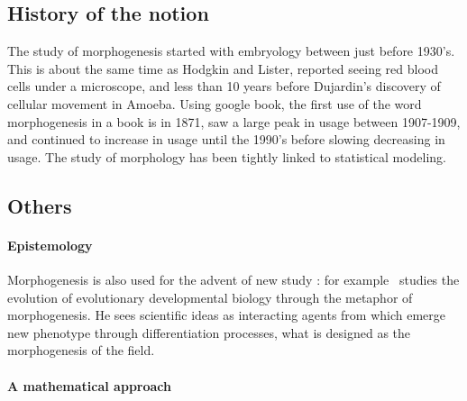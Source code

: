 \documentclass[fleqn,10pt]{wlscirep}
\begin{document}
\subsection*{History of the notion}
The study of morphogenesis started with embryology between just before 1930's. This is about the same time as Hodgkin and Lister, reported seeing red blood cells under a microscope, and less than 10 years before Dujardin's discovery of cellular movement in Amoeba. \cite{abercrombie1977concepts} Using google book, the first use of the word morphogenesis in a book is in 1871, saw a large peak in usage between 1907-1909, and continued to increase in usage until the 1990's before slowing decreasing in usage. 
The study of morphology has been tightly linked to statistical modeling. 



\subsection*{Others}

\paragraph{Epistemology}

Morphogenesis is also used for the advent of new study : for example~\cite{gilbert2003morphogenesis} studies the evolution of evolutionary developmental biology through the metaphor of morphogenesis. He sees scientific ideas as interacting agents from which emerge new phenotype through differentiation processes, what is designed as the morphogenesis of the field.


\paragraph{A mathematical approach}
\end{document}

